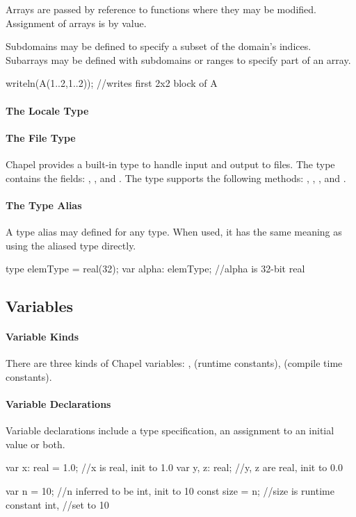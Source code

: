 Arrays are passed by reference to functions
where they may be modified.  Assignment of arrays is by value.

Subdomains may be
defined to specify a subset of the domain's indices. Subarrays may be defined
with subdomains or ranges to specify part of an array.
\begin{chapel}
writeln(A(1..2,1..2)); //writes first 2x2 block of A
\end{chapel}

\paragraph{The Locale Type}
\paragraph{The File Type}
Chapel provides a built-in  type to handle input and
output to files.  The  type contains the
fields:  , , and .
The  type supports the following methods:
, , ,  and .

\paragraph{The Type Alias}
A type alias may defined for any type.  When used, it has the
same meaning as using the aliased type directly.
\begin{chapel}
type elemType = real(32);
var alpha: elemType; //alpha is 32-bit real
\end{chapel}

\subsection{Variables}
\paragraph{Variable Kinds}
There are three kinds of Chapel variables: ,
 (runtime constants),  (compile time constants).

\paragraph{Variable Declarations}
Variable declarations include a type specification, an assignment
to an initial value or both.
\begin{chapel}
var x: real = 1.0; //x is real, init to 1.0
var y, z: real; //y, z are real, init to 0.0

var n = 10; //n inferred to be int, init to 10
const size = n; //size is runtime constant int,
                //set to 10
\end{chapel}

